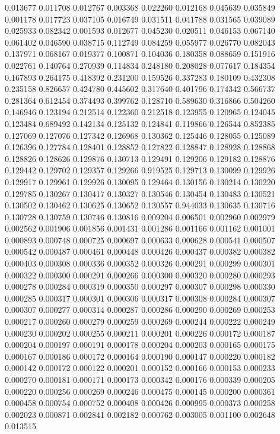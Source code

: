 0.013677
0.011708
0.012767
0.003368
0.022260
0.012168
0.045639
0.035849
0.001178
0.017723
0.037105
0.016749
0.031511
0.041788
0.031565
0.039089
0.025933
0.082342
0.001593
0.012677
0.045230
0.020511
0.046153
0.067140
0.061402
0.046590
0.038715
0.112749
0.084259
0.055977
0.026770
0.082043
0.137971
0.068167
0.019377
0.100871
0.104036
0.180358
0.088659
0.151916
0.022761
0.140764
0.270939
0.114834
0.248180
0.208028
0.077617
0.184354
0.167893
0.264175
0.418392
0.231200
0.159526
0.337283
0.180109
0.432308
0.235158
0.826657
0.424780
0.445602
0.317640
0.401796
0.174342
0.566737
0.281364
0.612454
0.374493
0.399762
0.128710
0.589630
0.316866
0.504260
0.146946
0.123194
0.212514
0.122360
0.212518
0.123955
0.120965
0.124045
0.123484
0.689492
0.142134
0.125132
0.124841
0.119866
0.126544
0.852385
0.127069
0.127076
0.127342
0.126968
0.130362
0.125446
0.128055
0.125089
0.126396
0.127784
0.128401
0.128852
0.127822
0.128847
0.128928
0.128868
0.128826
0.128626
0.129876
0.130713
0.129491
0.129206
0.129182
0.128876
0.129442
0.129702
0.129357
0.129266
0.919525
0.129713
0.130099
0.129926
0.129917
0.129961
0.129926
0.130095
0.129464
0.130156
0.130214
0.130220
0.129785
0.130267
0.130417
0.130327
0.130546
0.130454
0.130483
0.130521
0.130502
0.130462
0.130625
0.130652
0.130557
0.944033
0.130635
0.130716
0.130728
0.130759
0.130746
0.130816
0.009204
0.006501
0.002960
0.002979
0.002562
0.001906
0.001856
0.001431
0.001286
0.001166
0.001162
0.001001
0.000893
0.000748
0.000725
0.000697
0.000633
0.000628
0.000541
0.000507
0.000542
0.000487
0.000461
0.000448
0.000426
0.000437
0.000382
0.000382
0.000403
0.000308
0.000336
0.000352
0.000326
0.000291
0.000299
0.000301
0.000322
0.000300
0.000291
0.000266
0.000300
0.000320
0.000280
0.000293
0.000278
0.000284
0.000319
0.000350
0.000297
0.000307
0.000298
0.000330
0.000285
0.000317
0.000301
0.000306
0.000317
0.000308
0.000284
0.000307
0.000307
0.000277
0.000314
0.000287
0.000286
0.000290
0.000269
0.000253
0.000217
0.000260
0.000279
0.000259
0.000269
0.000244
0.000222
0.000249
0.000230
0.000202
0.000255
0.000211
0.000201
0.000226
0.000172
0.000187
0.000204
0.000197
0.000191
0.000178
0.000204
0.000203
0.000165
0.000175
0.000167
0.000186
0.000172
0.000164
0.000190
0.000147
0.000220
0.000182
0.000142
0.000172
0.000122
0.000201
0.000152
0.000166
0.000153
0.000233
0.000270
0.000181
0.000171
0.000173
0.000342
0.000176
0.000339
0.000205
0.000220
0.000256
0.000269
0.000246
0.000475
0.000145
0.000200
0.000361
0.000458
0.000754
0.000752
0.000408
0.000426
0.000995
0.000373
0.000258
0.002023
0.000871
0.002841
0.002182
0.000762
0.003005
0.001100
0.002648
0.013515
